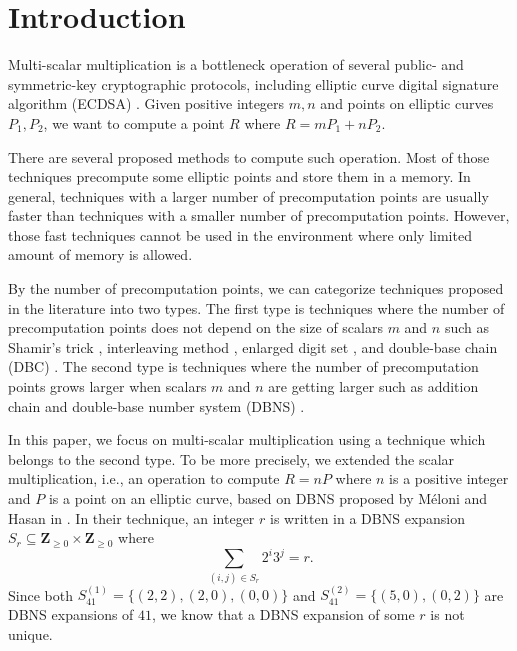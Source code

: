 \section{Introduction}

Multi-scalar multiplication is a bottleneck operation of several public- and symmetric-key cryptographic protocols,
including elliptic curve digital signature algorithm (ECDSA) \cite{ECDSA}.
Given positive integers $m, n$ and points on elliptic curves $P_1, P_2$,
we want to compute a point $R$ where
$R = m P_1 + n P_2.$

There are several proposed methods to compute such operation.
Most of those techniques precompute some elliptic points and store them in a memory.
In general, techniques with a larger number of precomputation points are usually faster than techniques with a smaller number of precomputation points.
However, those fast techniques cannot be used in the environment where only limited amount of memory is allowed.

By the number of precomputation points, we can categorize techniques proposed in the literature into two types.
The first type is techniques where the number of precomputation points does not depend on the size of scalars $m$ and $n$ such as Shamir’s trick \cite{Shamir},
interleaving method \cite{interleaving}, enlarged digit set \cite{enlarged2,enlarged4,enlarged1,enlarged3}, and double-base chain (DBC) \cite{dbc2,dbc3,DKS09}.
The second type is techniques where the number of precomputation points grows larger when scalars $m$ and $n$ are getting larger such as addition chain \cite{additionChain1,additionChain2}
and double-base number system (DBNS)  \cite{MH09}.

In this paper, we focus on multi-scalar multiplication using a technique which belongs to the second type.
To be more precisely, we extended the scalar multiplication, i.e., an operation to compute $R = nP$ where $n$ is a positive integer and $P$ is a point on an elliptic curve,
based on DBNS proposed by M\'eloni and Hasan in \cite{MH09}.
In their technique, an integer $r$ is written in a DBNS expansion $S_r \subseteq \mathbf{Z}_{\geq 0} \times \mathbf{Z}_{\geq 0}$ where
$$\sum_{(i,j) \in S_r} 2^i 3^j = r.$$ 
Since both $S^{(1)}_{41} = \{(2,2), (2,0), (0,0)\}$ and $S^{(2)}_{41} = \{(5,0), (0,2)\}$ are DBNS expansions of $41$, we know that a DBNS expansion of some $r$ is not unique.

